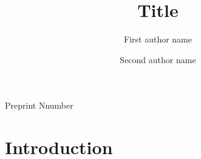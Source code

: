 \documentclass[12pt]{article}
\title{{\bfseries Title}}
\author[1]{First author name}
\author[1,2]{Second author name}
\affil[1]{{\small \textit{Institution 1}}}
\affil[2]{{\small \textit{Institution 2}}}
\date{}
\begin{document}
\hfill Preprint  Nnumber

{\let\newpage\relax\maketitle}

\begin{abstract}


\end{abstract}




\thispagestyle{empty}
\clearpage


\section{Introduction}
\label{sec:introduction}





\end{document}
